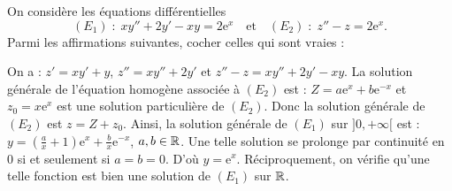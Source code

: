 \begin{question}
On considère les équations différentielles 
$$(E_1)\; :\; xy''+2y'-xy=2\mathrm{e}^{x}\quad\mbox{et}\quad (E_2)\; :\; z''-z=2\mathrm{e}^{x}.$$
Parmi les affirmations suivantes, cocher celles qui sont vraies :
\begin{answers}  
\good{La solution générale de $(E_1)$ sur $]0,+\infty[$ est $\displaystyle y=\left(\frac{a}{x}+1\right)\mathrm{e}^{x}+\frac{b}{x}\mathrm{e}^{-x}$, $a,b\in \Rr$.}
\end{answers}
\begin{explanations}
On a : $z'=xy'+y$, $z''=xy''+2y'$ et $z''-z=xy''+2y'-xy$. La solution générale de l'équation homogène associée à $(E_2)$ est : $Z=a\mathrm{e}^{x}+b\mathrm{e}^{-x}$ et $z_0=x\mathrm{e}^{x}$ est une solution particulière de $(E_2)$. Donc la solution générale de $(E_2)$ est $z=Z+z_0$. Ainsi, la solution générale de $(E_1)$ sur $]0,+\infty[$ est : $\displaystyle y=\left(\frac{a}{x}+1\right)\mathrm{e}^{x}+\frac{b}{x}\mathrm{e}^{-x}$, $a,b\in \Rr$. Une telle solution se prolonge par continuité en $0$ si et seulement si $a=b=0$. D'où $\displaystyle y=\mathrm{e}^{x}$. Réciproquement, on vérifie qu'une telle fonction est bien une solution de $(E_1)$ sur $\mathbb{R}$.
\end{explanations}
\end{question}
